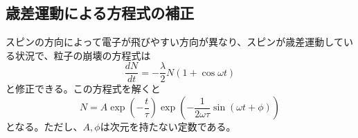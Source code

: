 \subsection{歳差運動による方程式の補正}
スピンの方向によって電子が飛びやすい方向が異なり、スピンが歳差運動している状況で、粒子の崩壊の方程式は
\begin{equation}
\frac{dN}{dt}=-\frac{\lambda}{2}N(1+\cos\omega t)
\end{equation}
と修正できる。この方程式を解くと
\begin{equation}
N = A\exp\left(-\frac{t}{\tau}\right)\exp\left(-\frac{1}{2\omega\tau}\sin(\omega t+\phi)\right)
\end{equation}
となる。ただし、$A,\phi$は次元を持たない定数である。
